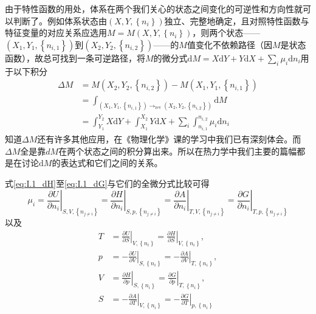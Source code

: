 \documentclass[main.tex]{subfiles}
\begin{document}
由于特性函数的用处，体系在两个我们关心的状态之间变化的可逆性和方向性就可以判断了。例如体系状态由$\left(X,Y,\left\{n_i\right\}\right)$独立、完整地确定，且对照特性函数与特征变量的对应关系应选用$M=M\left(X,Y,\left\{n_i\right\}\right)$，则两个状态——$\left(X_1,Y_1,\left\{n_{i,1}\right\}\right)$到$\left(X_2,Y_2,\left\{n_{i,2}\right\}\right)$——的$M$值变化不依赖路径（因$M$是状态函数），故总可找到一条可逆路径，将$M$的微分式$\mathrm{d}M=X\mathrm{d}Y+Y\mathrm{d}X+\sum_i\mu_i\mathrm{d}n_i$用于以下积分
\begin{equation}
    \begin{aligned}\label{eq:I.1_integral_of_function}
        \Delta M & =M\left(X_2,Y_2,\left\{n_{i,2}\right\}\right)-M\left(X_1,Y_1,\left\{n_{i,1}\right\}\right)                                      \\
                 & =\int_{\left(X_1,Y_1,\left\{n_{i,1}\right\}\right)\rightarrow_\text{rev}\left(X_2,Y_2,\left\{n_{i,2}\right\}\right)}\mathrm{d}M \\
                 & =\int_{Y_1}^{Y_2}X\mathrm{d}Y+\int_{X_1}^{X_2}Y\mathrm{d}X+\sum_i\int_{n_{i,1}}^{n_{i,2}}\mu_i\mathrm{d}n_i
    \end{aligned}
\end{equation}
知道$\Delta M$还有许多其他应用，在《物理化学》课的学习中我们已有深刻体会。而$\Delta M$全是靠$dM$在两个状态之间的积分算出来。所以在热力学中我们主要的篇幅都是在讨论$\mathrm{d}M$的表达式和它们之间的关系。

式\eqref{eq:I.1_dH}至\eqref{eq:I.1_dG}与它们的全微分式比较可得
\begin{equation}
    \mu_i=\left.\frac{\partial U}{\partial n_i}\right|_{S,V,\left\{n_{j\neq i}\right\}}
    =\left.\frac{\partial H}{\partial n_i}\right|_{S,p,\left\{n_{j\neq i}\right\}}
    =\left.\frac{\partial A}{\partial n_i}\right|_{T,V,\left\{n_{j\neq i}\right\}}
    =\left.\frac{\partial G}{\partial n_i}\right|_{T,p,\left\{n_{j\neq i}\right\}}\label{eq:I.1_first_order_partial_mu}
\end{equation}
以及
\begin{align}
    T & =\left.\frac{\partial U}{\partial S}\right|_{V,\left\{n_i\right\}}=\left.\frac{\partial H}{\partial S}\right|_{V,\left\{n_i\right\}},\label{eq:I.1_first_order_partial_T}   \\
    p & =-\left.\frac{\partial U}{\partial V}\right|_{S,\left\{n_i\right\}}=-\left.\frac{\partial A}{\partial V}\right|_{T,\left\{n_i\right\}},\label{eq:I.1_first_order_partial_p} \\
    V & =\left.\frac{\partial H}{\partial p}\right|_{S,\left\{n_i\right\}}=\left.\frac{\partial G}{\partial p}\right|_{T,\left\{n_i\right\}},\label{eq:I.1_first_order_partial_V}   \\
    S & =-\left.\frac{\partial A}{\partial T}\right|_{V,\left\{n_i\right\}}=-\left.\frac{\partial G}{\partial T}\right|_{p,\left\{n_i\right\}}\label{eq:I.1_first_order_partial_S}
\end{align}
\end{document}
